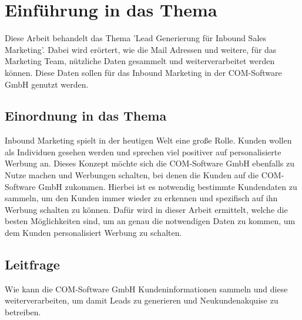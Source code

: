 \documentclass[hidelinks,12pt,a4paper]{article}
\begin{document}
	
	\maketitle
	\thispagestyle{empty}
	
	\newpage
	\pagestyle{headings}
	
	
	
	\newpage
	\pagestyle{headings}
	
	\newpage
	
	\pagestyle{headings}
	\section*{}
	\tableofcontents
	\newpage
	\listoffigures
	
	
	
	
	\newpage
	\setcounter{page}{1}
	
	\section{Einführung in das Thema}
	Diese Arbeit behandelt das Thema 'Lead Generierung für Inbound Sales Marketing'. Dabei wird erörtert, wie die Mail Adressen und weitere, für das Marketing Team, nützliche Daten gesammelt und weiterverarbeitet werden können. Diese Daten sollen für das Inbound Marketing in der COM-Software GmbH genutzt werden.
	
	\subsection{Einordnung in das Thema}
	Inbound Marketing spielt in der heutigen Welt eine große Rolle. Kunden wollen als Individuen gesehen werden und sprechen viel positiver auf personalisierte Werbung an. Dieses Konzept möchte sich die COM-Software GmbH ebenfalls zu Nutze machen und Werbungen schalten, bei denen die Kunden auf die COM-Software GmbH zukommen. Hierbei ist es notwendig bestimmte Kundendaten zu sammeln, um den Kunden immer wieder zu erkennen und spezifisch auf ihn Werbung schalten zu können.
	\newline
	Dafür wird in dieser Arbeit ermittelt, welche die besten Möglichkeiten sind, um an genau die notwendigen Daten zu kommen, um dem Kunden personalisiert Werbung zu schalten. 

	\subsection{Leitfrage}
	Wie kann die COM-Software GmbH Kundeninformationen sammeln und diese weiterverarbeiten, um damit Leads zu generieren und Neukundenakquise zu betreiben.
	
\end{document}
